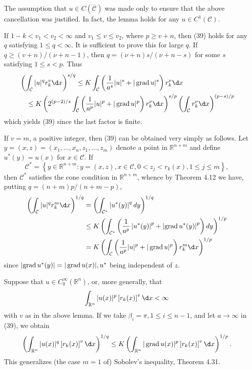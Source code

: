 \begin{remarks}
  \item The assumption that $u \in C(\overline{\mathcal{C}})$ was made only to ensure that the above cancellation was justified. In fact, the lemma holds for any $u \in C^1(\mathcal{C})$.
  \item If $1-k<v_1<v_2<\infty$ and $v_1 \leq v \leq v_2$, where $p \geq v+n$, then (39) holds for any $q$ satisfying $1 \leq q<\infty$. It is sufficient to prove this for large $q$. If $q \geq(v+n) /(\nu+n-1)$, then $q=(\nu+n) s /(\nu+n-s)$ for some $s$ satisfying $1 \leq s<p$. Thus
  \[
  \begin{aligned}
  & \left(\int_{\mathcal{C}}|u|^q r_k^v \d x\right)^{s / q} \leq K \int_{\mathcal{C}}\left(\frac{1}{a^s}|u|^s+|\grad u|^s\right) r_k^\nu \d x \\
  & \quad \leq K\left(2^{(p-2) / s} \int_{\mathcal{C}}\left(\frac{1}{a^p}|u|^p+|\grad u|^p\right) r_k^\nu \d x\right)^{s / p}\left(\int_{\mathcal{C}} r_k^\nu \d x\right)^{(p-s) / p}
  \end{aligned}
  \]
  which yields (39) since the last factor is finite.
  \item If $v=m$, a positive integer, then (39) can be obtained very simply as follows. Let $y=(x, z)=\left(x_1, \ldots, x_n, z_1, \ldots, z_m\right)$ denote a point in $\mathbb{R}^{n+m}$ and define $u^*(y)=u(x)$ for $x \in \mathcal{C}$. If
  \[
  \mathcal{C}^*=\left\{y \in \mathbb{R}^{n+m}: y=(x, z), x \in \mathcal{C}, 0<z_j<r_k(x), 1 \leq j \leq m\right\},
  \]
  then $\mathcal{C}^*$ satisfies the cone condition in $\mathbb{R}^{n+m}$, whence by Theorem 4.12 we have, putting $q=(n+m) p /(n+m-p)$,
  \[
  \begin{aligned}
  \left(\int_{\mathcal{C}}|u|^q r_k^m \d x\right)^{1 / q} & =\left(\int_{\mathcal{C}^*}\left|u^*(y)\right|^q d y\right)^{1 / q} \\
  & \leq K\left(\int_{\mathcal{C}^*}\left(\frac{1}{a^p}\left|u^*(y)\right|^p+\left|\grad u^*(y)\right|^p\right) d y\right)^{1 / p} \\
  & =K\left(\int_{\mathcal{C}}\left(\frac{1}{a^p}|u|^p+|\grad u|^p\right) r_k^m \d x\right)^{1 / p}
  \end{aligned}
  \]
  since $\left|\operatorname{grad} u^*(y)\right|=|\operatorname{grad} u(x)|, u^*$ being independent of $z$.
  \item Suppose that $u \in C_0^{\infty}\left(\mathbb{R}^n\right)$, or, more generally, that
  \[
  \int_{\mathbb{R}^n}|u(x)|^p\left[r_k(x)\right]^v \d x<\infty
  \]
  with $v$ as in the above lemma. If we take $\beta_i=\pi, 1 \leq i \leq n-1$, and let $a \rightarrow \infty$ in (39), we obtain
  \[
  \left(\int_{\mathbb{R}^n}|u(x)|^q\left[r_k(x)\right]^v \d x\right)^{1 / q} \leq K\left(\int_{\mathbb{R}^n}|\grad u(x)|^p\left[r_k(x)\right]^v \d x\right)^{1 / p} .
  \]
  This generalizes (the case $m=1$ of) Sobolev's inequality, Theorem 4.31.
\end{remarks}

